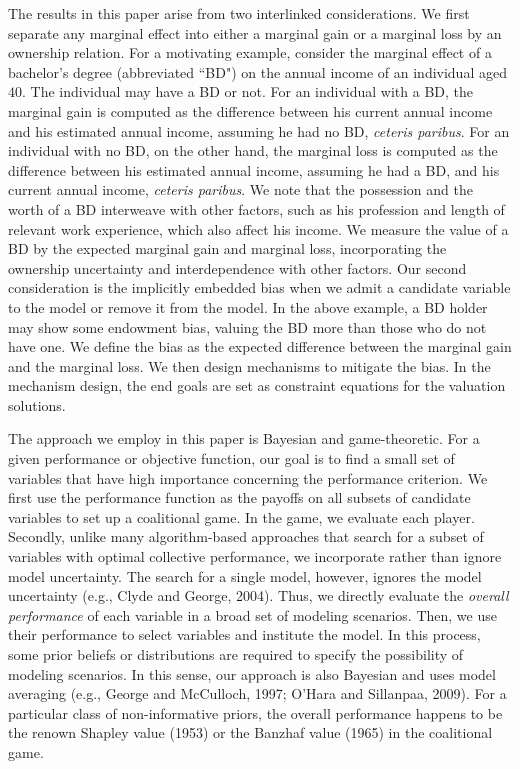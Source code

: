 \documentclass[a4paper,12pt]{article}
\begin{document}
The results in this paper arise from two interlinked considerations. 
We first separate any marginal effect into  either a marginal gain or a marginal loss by an ownership relation.
For a motivating example, consider the marginal effect  of a bachelor's  degree (abbreviated ``BD") on the 
annual income of an individual aged $40$. The individual may have a BD or not.
For an individual with a BD, the marginal gain is computed as the difference between his current annual income and
his estimated annual income, assuming he had no BD, \textit{ceteris paribus}.  
For an individual with no BD, on the other hand, the marginal loss is computed as the difference between 
his estimated annual income, assuming  he had a BD, and his current annual income, \textit{ceteris paribus}. 
We note that the possession and the worth of a BD interweave
with other factors, such as his profession and length of relevant work experience, which also affect his income. 
We measure the value of a BD by the expected marginal gain and marginal loss, 
incorporating the ownership uncertainty and interdependence with other factors.
Our second consideration is the implicitly embedded bias when we admit a candidate variable to the model or remove it from the model. 
In the above example, a BD holder may show some endowment bias, valuing the BD more than those who do not have one.
We define the bias as the expected difference between the marginal gain and 
the marginal loss. We then design mechanisms to mitigate the bias. 
In the mechanism design, the end goals are set as constraint equations for the valuation solutions.

The approach we employ in this paper is Bayesian and game-theoretic.
For a given performance or objective function, our goal is to find a small set of variables that have high importance concerning  the performance criterion. 
We first use the performance function as the payoffs on all subsets of candidate variables to set up a coalitional game. 
In the game, we evaluate each player.
Secondly, unlike many algorithm-based approaches that search for a subset of variables with optimal collective performance, we incorporate rather than ignore model uncertainty. 
The search for a single model, however, ignores the model uncertainty (e.g., Clyde and George, 2004). 
Thus, we directly evaluate the \textit{overall performance} of each variable in a broad set of modeling scenarios. 
Then, we use their performance to select variables and institute the model. 
In this process, some prior beliefs or distributions are required to specify the possibility of modeling scenarios. 
In this sense, our approach is also Bayesian and uses model averaging (e.g., George and McCulloch, 1997;  O'Hara and Sillanpaa, 2009).
For a particular class of non-informative priors, the overall performance happens to be the renown Shapley value (1953) or the Banzhaf value (1965) in the coalitional game. 
\end{document}
